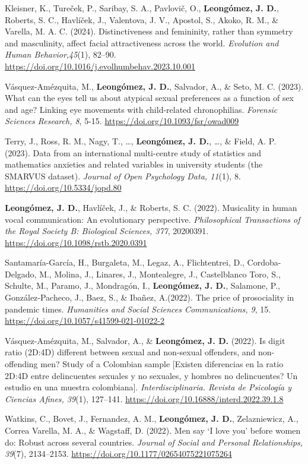 \documentclass[11pt,a4paper,]{awesome-cv}
\begin{document}
Kleisner, K., Tureček, P., Saribay, S. A., Pavlovič, O.,
\textbf{Leongómez, J. D.}, Roberts, S. C., Havlíček, J., Valentova, J.
V., Apostol, S., Akoko, R. M., \& Varella, M. A. C. (2024).
Distinctiveness and femininity, rather than symmetry and masculinity,
affect facial attractiveness across the world. \emph{Evolution and Human
Behavior,45}(1), 82--90.
\href{https://authors.elsevier.com/c/1hyfr3tz492kal}{https://doi.org/10.1016/j.evolhumbehav.2023.10.001}

Vásquez-Amézquita, M., \textbf{Leongómez, J. D.}, Salvador, A., \& Seto,
M. C. (2023). What can the eyes tell us about atypical sexual
preferences as a function of sex and age? Linking eye movements with
child-related chronophilias. \emph{Forensic Sciences Research, 8}, 5-15.
\url{https://doi.org/10.1093/fsr/owad009}

Terry, J., Ross, R. M., Nagy, T., \ldots, \textbf{Leongómez, J. D.},
\ldots, \& Field, A. P. (2023). Data from an international multi-centre
study of statistics and mathematics anxieties and related variables in
university students (the SMARVUS dataset). \emph{Journal of Open
Psychology Data, 11}(1), 8. \url{https://doi.org/10.5334/jopd.80}

\textbf{Leongómez, J. D.}, Havlíček, J., \& Roberts, S. C. (2022).
Musicality in human vocal communication: An evolutionary perspective.
\emph{Philosophical Transactions of the Royal Society B: Biological
Sciences, 377}, 20200391. \url{https://doi.org/10.1098/rstb.2020.0391}

Santamaría-García, H., Burgaleta, M., Legaz, A., Flichtentrei, D.,
Cordoba-Delgado, M., Molina, J., Linares, J., Montealegre, J.,
Castelblanco Toro, S., Schulte, M., Paramo, J., Mondragón, I.,
\textbf{Leongómez, J. D.}, Salamone, P., González‑Pacheco, J., Baez, S.,
\& Ibañez, A.(2022). The price of prosociality in pandemic times.
\emph{Humanities and Social Sciences Communications, 9}, 15.
\url{https://doi.org/10.1057/s41599-021-01022-2}

Vásquez-Amézquita, M., Salvador, A., \& \textbf{Leongómez, J. D.}
(2022). Is digit ratio (2D:4D) different between sexual and non-sexual
offenders, and non-offending men? Study of a Colombian sample {[}Existen
diferencias en la ratio 2D:4D entre delincuentes sexuales y no sexuales,
y hombres no delincuentes? Un estudio en una muestra colombiana{]}.
\emph{Interdisciplinaria. Revista de Psicología y Ciencias Afines,
39}(1), 127--141. \url{https://doi.org/10.16888/interd.2022.39.1.8}

Watkins, C., Bovet, J., Fernandez, A. M., \textbf{Leongómez, J. D.},
Zelazniewicz, A., Correa Varella, M. A., \& Wagstaff, D. (2022). Men say
`I love you' before women do: Robust across several countries.
\emph{Journal of Social and Personal Relationships, 39}(7), 2134--2153.
\url{https://doi.org/10.1177/02654075221075264}
\end{document}
